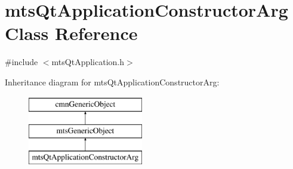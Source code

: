 \hypertarget{classmts_qt_application_constructor_arg}{\section{mts\-Qt\-Application\-Constructor\-Arg Class Reference}
\label{classmts_qt_application_constructor_arg}
}


{\ttfamily \#include $<$mts\-Qt\-Application.\-h$>$}

Inheritance diagram for mts\-Qt\-Application\-Constructor\-Arg\-:\begin{figure}[H]
\begin{center}
\leavevmode
\includegraphics[height=3.000000cm]{d8/d27/classmts_qt_application_constructor_arg}
\end{center}
\end{figure}
